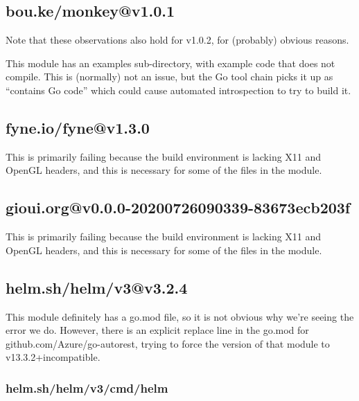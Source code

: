\documentclass[a4paper]{paper}
\begin{document}
\subsection{bou.ke/monkey@v1.0.1}

Note that these observations also hold for v1.0.2, for (probably) obvious reasons.

This module has an examples sub-directory, with example code that does
not compile. This is (normally) not an issue, but the Go tool chain
picks it up as ``contains Go code'' which could cause automated
introspection to try to build it.

\subsection{fyne.io/fyne@v1.3.0}

This is primarily failing because the build environment is lacking X11
and OpenGL headers, and this is necessary for some of the files in the
module.

\subsection{gioui.org@v0.0.0-20200726090339-83673ecb203f}

This is primarily failing because the build environment is lacking X11
and OpenGL headers, and this is necessary for some of the files in the
module.


\subsection{helm.sh/helm/v3@v3.2.4}

This module definitely has a go.mod file, so it is not obvious why we're seeing the error we do. However, there is an explicit replace line in the go.mod for github.com/Azure/go-autorest, trying to force the version of that module to v13.3.2+incompatible. 

\subsubsection{helm.sh/helm/v3/cmd/helm}
\end{document}
